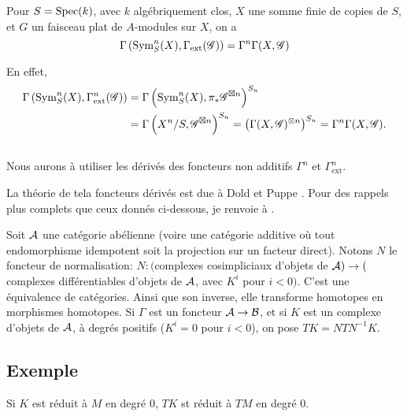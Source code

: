 \begin{lemma_}\label{III:1-3}
Pour $S=\operatorname{Spec}(k)$, avec $k$ algébriquement clos, $X$ une somme finie de 
copies de $S$, et $G$ un faisceau plat de $A$-modules sur $X$, on a 
\[
  \Gamma\left(\operatorname{Sym}_S^n(X),\Gamma_\text{ext}(\mathscr{G})\right) = \Gamma^n \Gamma(X,\mathscr{G})
\]
\end{lemma_}

En effet, 
\begin{align*}
  \Gamma\left(\operatorname{Sym}_S^n(X),\Gamma_\text{ext}^n(\mathscr{G})\right) 
    &= \Gamma\left(\operatorname{Sym}_S^n(X),\pi_*\mathscr{G}^{\boxtimes n}\right)^{S_n} \\
    &= \Gamma\left(X^n/S,\mathscr{G}^{\boxtimes n}\right)^{S_n} 
    = \left(\Gamma(X,\mathscr{G})^{\otimes n}\right)^{S_n} 
    = \Gamma^n \Gamma(X,\mathscr{G}) \text{.}
\end{align*}





\subsection{}\label{III:1-4}

Nous aurons à utiliser les dérivés des foncteurs non additifs $\Gamma^n$ 
et $\Gamma_\text{ext}^n$. 

La théorie de tela foncteurs dérivés est due à Dold et Puppe 
\cite{do61}. Pour des rappels plus complets que ceux donnés ci-dessous, je 
renvoie à \cite[XVII 5.5.3]{sga4}. 

Soit $\mathcal{A}$ une catégorie abélienne (voire une catégorie additive où 
tout endomorphisme idempotent soit la projection sur un facteur direct). Notons 
$N$ le foncteur de normalisation: $N:($complexes cosimpliciaux d'objets de 
$\mathcal{A})\to($complexes différentiables d'objets de $\mathcal{A}$, avec $K^i$ pour 
$i<0)$. C'est une équivalence de catégories. Ainsi que son inverse, elle 
transforme homotopes en morphismes homotopes. Si $\Gamma$ est un foncteur 
$\mathcal{A}\to\mathcal{B}$, et si $K$ est un complexe d'objets de $\mathcal{A}$, à degrés 
positifs ($K^i=0$ pour $i<0$), on pose $T K=N T N^{-1} K$. 





\subsection{Exemple}\label{III:1-5}

Si $K$ est réduit à $M$ en degré $0$, $T K$ st réduit à $T M$ en 
degré $0$. 





